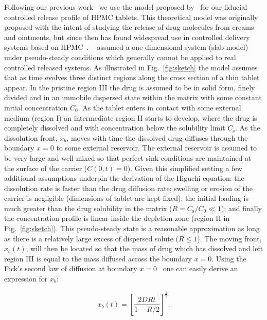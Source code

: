 \documentclass[superbib,unsortedaddress,preprint,byrevtex,aps,noshowpacs,titlepage]{revtex4}
\def\Co{C_0}
\def\Cs{C_\text{s}}
\begin{document}
Following our previous work~\cite{Reis2004} we use the model proposed by~\textcite{Higuchi1961} 
for our fiducial controlled release profile of HPMC tablets.
This theoretical model was originally proposed with the intent of studying the release of drug 
molecules from creams and ointments, but since then has found widespread use in controlled delivery 
systems based on HPMC~\cite{Costa2001,Siepmann2001}.
~\textcite{Higuchi1961} assumed a one-dimensional system (slab model) under pseudo-steady 
conditions which generally cannot be applied to real controlled released systems.
As illustrated in Fig.~\ref{fig:sketch} the model assumes that as time evolves three distinct regions 
along the cross section of a thin tablet appear. 
In the pristine region III the drug is assumed to be in solid form, finely divided and in an immobile 
dispersed state within the matrix with some constant initial concentration $\Co$. 
As the tablet enters in contact with some external medium (region I) an intermediate region II starts 
to develop, where the drug is completely dissolved and with concentration below the solubility 
limit $\Cs$. 
As the dissolution front, $x_b$, moves with time the dissolved
drug diffuses through the boundary $x = 0$ to some external reservoir. 
The external reservoir is assumed to be very large and well-mixed so that perfect sink conditions
are maintained at the surface of the carrier ($C(0,t) = 0$).
Given this simplified setting a few additional assumptions underpin the derivation of the Higuchi equation:
the dissolution rate is faster than the drug diffusion rate;
swelling or erosion of the carrier is negligible (dimensions of tablet are kept fixed);
the initial loading is much greater than the drug solubility in the matrix ($R=\Cs/\Co \ll 1$);
and finally the concentration profile is linear inside the depletion zone 
(region II in Fig.~\ref{fig:sketch}).
This pseudo-steady state is a reasonable approximation as long as there is a relatively large excess 
of dispersed solute ($R \le 1$). 
The moving front, $x_b(t)$, will then be located so that the mass of drug which has dissolved and left 
region III is equal to the mass diffused across the boundary $x=0$.
Using the Fick's second law of diffusion at boundary $x=0$~\cite{Crank1975} one can easily derive 
an expression for $x_b$:

\begin{equation}
  \label{eq:moving_bc}
  x_b(t) = \left[\frac{2DRt}{1-R/2}\right]^{\frac{1}{2}}.
\end{equation}
\end{document}
